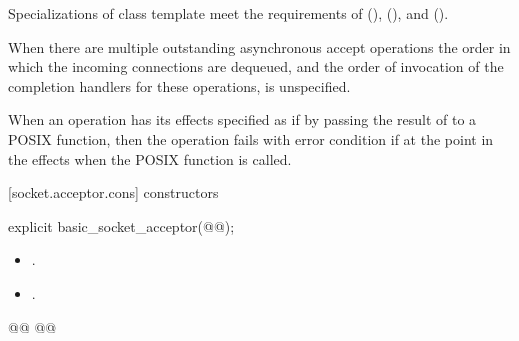 \pnum
Specializations of class template  meet the requirements of  (),  (), and  ().

\pnum
 When there are multiple outstanding asynchronous accept operations the order in which the incoming connections are dequeued, and the order of invocation of the completion handlers for these operations, is unspecified.

\pnum
When an operation has its effects specified as if by passing the result of  to a POSIX function, then the operation fails with error condition  if  at the point in the effects when the POSIX function is called.


[socket.acceptor.cons]{ constructors}

\begin{itemdecl}
explicit basic_socket_acceptor(@@);
\end{itemdecl}

\begin{itemdescr}
\pnum
\postconditions
\begin{itemize}
\item
{}.
\item
{}.
\end{itemize}
\end{itemdescr}

\begin{itemdecl}
@@
@@
\end{itemdecl}

\begin{itemdescr}
\addedpnum
{}

\addedpnum
{}
\end{itemdescr}

